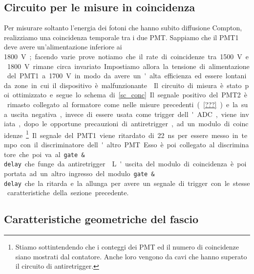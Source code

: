 \subsection{Circuito per le misure in coincidenza}

Per misurare soltanto l'energia dei fotoni che hanno subito diffusione Compton, realizziamo una coincidenza temporale tra i due PMT. Sappiamo che il PMT1 deve avere un'alimentazione inferiore ai \SI{1800}V; facendo varie prove notiamo che il rate di coincidenze tra \SI{1500}V e \SI{1800}V rimane circa invariato. Impostiamo allora la tensione di alimentazione del PMT1 a \SI{1700}V in modo da avere un'alta efficienza ed essere lontani da zone in cui il dispositivo è malfunzionante.

Il circuito di misura è stato poi ottimizzato e segue lo schema di \autoref{sc_conc}. Il segnale positivo del PMT2 è rimasto collegato al formatore come nelle misure precedenti (\autoref{???}) e la sua uscita negativa, invece di essere usata come trigger dell'ADC, viene inviata, dopo le opportune precauzioni di antiretrigger, ad un modulo di coincidenze%
\footnote{Stiamo sottintendendo che i conteggi dei PMT ed il numero di coincidenze siano mostrati dal contatore. Anche loro vengono da cavi che hanno superato il circuito di antiretrigger.}.

Il segnale del PMT1  viene ritardato di \SI{22}{ns} per essere messo in tempo con il discriminatore dell'altro PMT. Esso è poi collegato al discriminatore che poi va al \texttt{gate \& delay} che funge da antiretrigger.

L'uscita del modulo di coincidenza è poi portata ad un altro ingresso del modulo \texttt{gate \& delay} che la ritarda e la allunga per avere un segnale di trigger con le stesse caratteristiche della sezione precedente.


\subsection{Caratteristiche geometriche del fascio}

